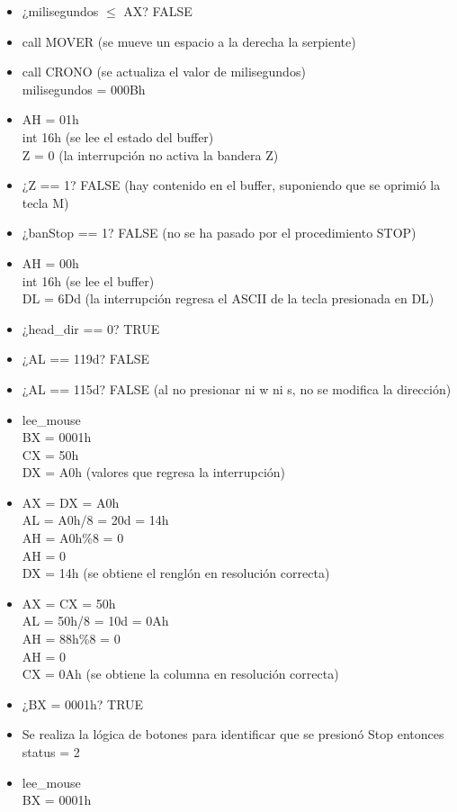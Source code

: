\documentclass[12pt]{article}
\begin{document}
\begin{enumerate}
\begin{itemize}
        \item ¿milisegundos $\leq$ AX? FALSE
        \item call MOVER (se mueve un espacio a la derecha la serpiente)
        \item call CRONO (se actualiza el valor de milisegundos) \\ milisegundos = 000Bh
        \item AH = 01h \\ int 16h (se lee el estado del buffer) \\ Z = 0 (la interrupción no activa la bandera Z)
        \item ¿Z == 1? FALSE (hay contenido en el buffer, suponiendo que se oprimió la tecla M)
        \item ¿banStop == 1? FALSE (no se ha pasado por el procedimiento STOP)
        \item AH = 00h \\ int 16h (se lee el buffer) \\ DL = 6Dd (la interrupción regresa el ASCII de la tecla presionada en DL)
        \item ¿head\_dir == 0? TRUE
        \item ¿AL == 119d? FALSE
        \item ¿AL == 115d? FALSE (al no presionar ni w ni s, no se modifica la dirección)
        \item lee\_mouse \\ BX = 0001h\\ CX = 50h \\ DX = A0h (valores que regresa la interrupción)
        \item AX = DX = A0h \\ AL = A0h/8 = 20d = 14h \\ AH = A0h\%8 = 0 \\ AH = 0 \\DX = 14h (se obtiene el renglón en resolución correcta)
        \item AX = CX = 50h \\ AL = 50h/8 = 10d = 0Ah \\ AH = 88h\%8 = 0 \\ AH = 0 \\CX = 0Ah (se obtiene la columna en resolución correcta)
        \item ¿BX = 0001h? TRUE
        \item Se realiza la lógica de botones para identificar que se presionó Stop entonces status = 2
        \item lee\_mouse \\ BX = 0001h

\end{itemize}
\end{enumerate}
\end{document}
